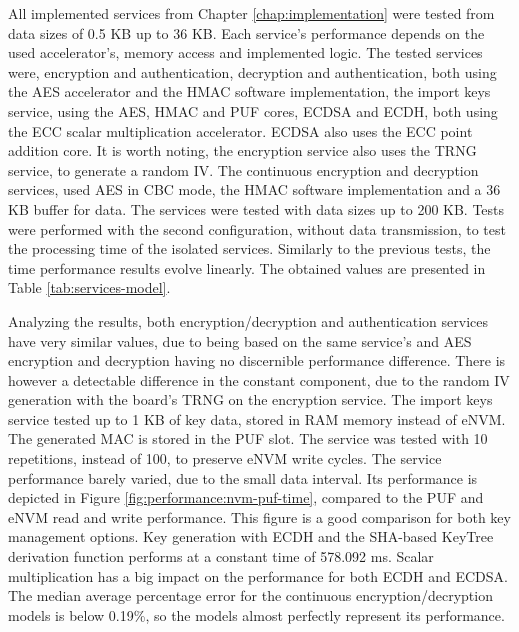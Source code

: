 All implemented services from Chapter \ref{chap:implementation} were tested from data sizes of 0.5 KB up to 36 KB. Each service's performance depends on the used accelerator's, memory access and implemented logic.
The tested services were, encryption and authentication, decryption and authentication, both using the AES accelerator and the HMAC software implementation, the import keys service, using the AES, HMAC and PUF cores, ECDSA and ECDH, both using the ECC scalar multiplication accelerator. ECDSA also uses the ECC point addition core. It is worth noting, the encryption service also uses the TRNG service, to generate a random IV. The continuous encryption and decryption services, used AES in CBC mode, the HMAC software implementation and a 36 KB buffer for data. The services were tested with data sizes up to 200 KB.
Tests were performed with the second configuration, without data transmission, to test the processing time of the isolated services.
Similarly to the previous tests, the time performance results evolve linearly. The obtained values are presented in Table \ref{tab:services-model}.



Analyzing the results, both encryption/decryption and authentication services have very similar values, due to being based on the same service's and AES encryption and decryption having no discernible performance difference.
There is however a detectable difference in the constant component, due to the random IV generation with the board's TRNG on the encryption service.
The import keys service tested up to 1 KB of key data, stored in RAM memory instead of eNVM. The generated MAC is stored in the PUF slot. The service was tested with 10 repetitions, instead of 100, to preserve eNVM write cycles.
The service performance barely varied, due to the small data interval. Its performance is depicted in Figure \ref{fig:performance:nvm-puf-time}, compared to the PUF and eNVM read and write performance. This figure is a good comparison for both key management options.
Key generation with ECDH and the SHA-based KeyTree derivation function performs at a constant time of 578.092 ms.
Scalar multiplication has a big impact on the performance for both ECDH and ECDSA.
The median average percentage error for the continuous encryption/decryption models is below 0.19\%, so the models almost perfectly represent its performance.%

